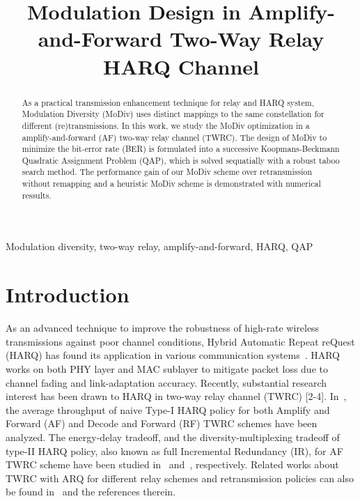 \documentclass{article}
\title{Modulation Design in Amplify-and-Forward Two-Way Relay HARQ Channel}
\begin{document}
%
\maketitle
%
\begin{abstract}
  As a practical transmission enhancement technique for relay and HARQ system,
  Modulation Diversity (MoDiv) uses distinct mappings to the same constellation
  for different (re)transmissions. 
  In this work, we study the MoDiv optimization
  in a amplify-and-forward (AF) two-way relay channel (TWRC). The design of
  MoDiv to minimize the bit-error rate (BER) is formulated into a successive
  Koopmans-Beckmann Quadratic Assignment Problem (QAP), which is solved
  sequatially with a robust taboo search method.
  The performance gain of our MoDiv scheme over retransmission without remapping
  and a heuristic MoDiv scheme is demonstrated with numerical ressults.
\end{abstract}
%
\begin{keywords}
  Modulation diversity, two-way relay, amplify-and-forward, HARQ, QAP
\end{keywords}
%
\section{Introduction}
\label{sec:intro}

As an advanced technique to improve the robustness of high-rate wireless
transmissions against poor channel conditions, Hybrid Automatic Repeat reQuest
(HARQ) has found its application in various communication
systems~\cite{cripriano2010overview}. HARQ works on both PHY layer and MAC
sublayer to mitigate packet loss due to channel fading and
link-adaptation accuracy. Recently, substantial research interest
has been drawn to HARQ in two-way relay channel
(TWRC) [2-4].
In~\cite{iannello2009throughput}, the average throughput of naive Type-I HARQ
policy for both Amplify and Forward (AF) and Decode and Forward (RF) TWRC schemes have
been analyzed. The energy-delay tradeoff, and the diversity-multiplexing
tradeoff of type-II HARQ policy, also known as full Incremental Redundancy (IR),
for AF TWRC scheme have been studied in~\cite{choi2013energy}
and~\cite{xu2014diversity}, respectively. Related works about TWRC with ARQ
for different relay schemes and retransmission policies can also be
found in~\cite{popovski2007wireless, chen2012arq, guan2015twoway} and the references therein.
\end{document}
